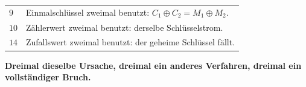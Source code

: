\begin{merksatz}
\begin{center}
{\small
\renewcommand{\arraystretch}{1.48}
\begin{tabular}{@{}P{1.8cm}P{6.6cm}@{}}
\toprule
$9$ & Einmalschlüssel zweimal benutzt: $C_1\oplus C_2 = M_1\oplus M_2$.\\
$10$ & Zählerwert zweimal benutzt: derselbe Schlüsselstrom.\\
$14$ & Zufallswert zweimal benutzt: der geheime Schlüssel fällt.\\
\bottomrule
\end{tabular}}
\end{center}

\begin{center}
\begin{minipage}{0.9\textwidth}
\textbf{Dreimal dieselbe Ursache, dreimal ein anderes Verfahren, dreimal ein vollständiger Bruch.}
\end{minipage}
\end{center}

\begin{center}
\begin{minipage}{0.88\textwidth}
\end{minipage}
\end{center}
\end{merksatz}

